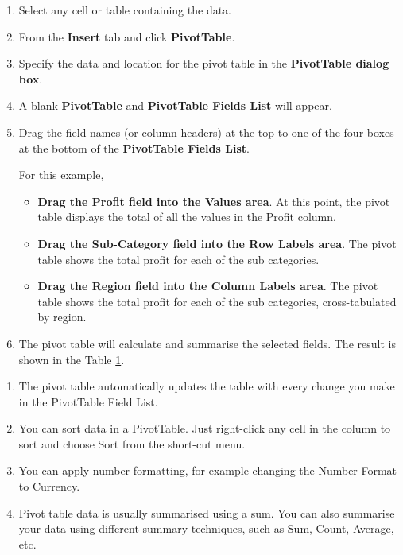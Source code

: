 \documentclass[
]{article}
\theoremstyle{definition}
\theoremstyle{definition}
\theoremstyle{definition}
\theoremstyle{definition}
\theoremstyle{remark}
\begin{document}
\begin{enumerate}
\def\labelenumi{\arabic{enumi}.}
\item
  Select any cell or table containing the data.
\item
  From the \textbf{Insert} tab and click \textbf{PivotTable}.
\item
  Specify the data and location for the pivot table in the
  \textbf{PivotTable dialog box}.
\item
  A blank \textbf{PivotTable} and \textbf{PivotTable Fields List} will appear.
\item
  Drag the field names (or column headers) at the top to one of the
  four boxes at the bottom of the \textbf{PivotTable Fields List}.

  For this example,

  \begin{itemize}
  \item
    \textbf{Drag the Profit field into the Values area}. At this point,
    the pivot table displays the total of all the values in the
    Profit column.
  \item
    \textbf{Drag the Sub-Category field into the Row Labels area}. The
    pivot table shows the total profit for each of the sub
    categories.
  \item
    \textbf{Drag the Region field into the Column Labels area}. The pivot
    table shows the total profit for each of the sub categories,
    cross-tabulated by region.
  \end{itemize}
\item
  The pivot table will calculate and summarise the selected fields.
  The result is shown in the Table \protect\hyperlink{Table1}{1}.
\end{enumerate}

\begin{enumerate}
\def\labelenumi{\arabic{enumi}.}
\item
  The pivot table automatically updates the table with every change
  you make in the PivotTable Field List.
\item
  You can sort data in a PivotTable. Just right-click any cell in the
  column to sort and choose Sort from the short-cut menu.
\item
  You can apply number formatting, for example changing the Number
  Format to Currency.
\item
  Pivot table data is usually summarised using a sum. You can also
  summarise your data using different summary techniques, such as Sum,
  Count, Average, etc.
\end{enumerate}
\end{document}
